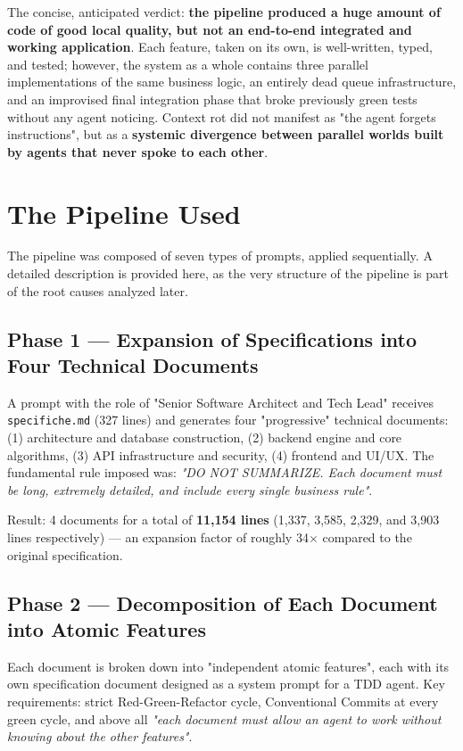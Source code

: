 \documentclass[11pt,a4paper]{article}
\newcommand{\file}[1]{\texttt{\small #1}}
\begin{document}
	The concise, anticipated verdict: \textbf{the pipeline produced a huge amount of code of good local quality, but not an end-to-end integrated and working application}. Each feature, taken on its own, is well-written, typed, and tested; however, the system as a whole contains three parallel implementations of the same business logic, an entirely dead queue infrastructure, and an improvised final integration phase that broke previously green tests without any agent noticing. Context rot did not manifest as "the agent forgets instructions", but as a \textbf{systemic divergence between parallel worlds built by agents that never spoke to each other}.
	
	\section{The Pipeline Used}
	
	The pipeline was composed of seven types of prompts, applied sequentially. A detailed description is provided here, as the very structure of the pipeline is part of the root causes analyzed later.
	
	\subsection{Phase 1 --- Expansion of Specifications into Four Technical Documents}
	A prompt with the role of "Senior Software Architect and Tech Lead" receives \file{specifiche.md} (327 lines) and generates four "progressive" technical documents: (1) architecture and database construction, (2) backend engine and core algorithms, (3) API infrastructure and security, (4) frontend and UI/UX. The fundamental rule imposed was: \emph{"DO NOT SUMMARIZE. Each document must be long, extremely detailed, and include every single business rule"}.
	
	Result: 4 documents for a total of \textbf{11,154 lines} (1,337, 3,585, 2,329, and 3,903 lines respectively) --- an expansion factor of roughly 34$\times$ compared to the original specification.
	
	\subsection{Phase 2 --- Decomposition of Each Document into Atomic Features}
	Each document is broken down into "independent atomic features", each with its own specification document designed as a system prompt for a TDD agent. Key requirements: strict Red-Green-Refactor cycle, Conventional Commits at every green cycle, and above all \emph{"each document must allow an agent to work without knowing about the other features"}.
	
\end{document}
